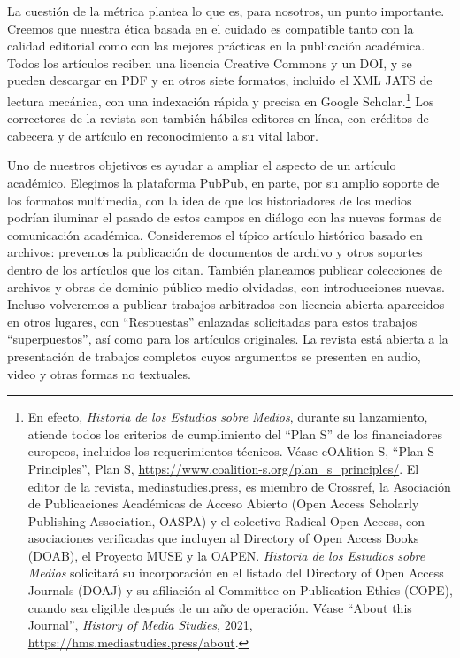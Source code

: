 \documentclass{tufte-handout}
\begin{document}
La cuestión de la métrica plantea lo que es, para nosotros, un punto
importante. Creemos que nuestra ética basada en el cuidado es compatible
tanto con la calidad editorial como con las mejores prácticas en la
publicación académica. Todos los artículos reciben una licencia Creative
Commons y un DOI, y se pueden descargar en PDF y en otros siete
formatos, incluido el XML JATS de lectura mecánica, con una indexación
rápida y precisa en Google Scholar.\footnote{En efecto, \emph{Historia
  de los Estudios sobre Medios}, durante su lanzamiento, atiende todos
  los criterios de cumplimiento del ``Plan S'' de los financiadores
  europeos, incluidos los requerimientos técnicos. Véase cOAlition S,
  ``Plan S Principles'', Plan S,
  \url{https://www.coalition-s.org/plan_s_principles/}. El editor de la
  revista, mediastudies.press, es miembro de Crossref, la Asociación de
  Publicaciones Académicas de Acceso Abierto (Open Access Scholarly
  Publishing Association, OASPA) y el colectivo Radical Open Access, con
  asociaciones verificadas que incluyen al Directory of Open Access
  Books (DOAB), el Proyecto MUSE y la OAPEN. \emph{Historia de los
  Estudios sobre Medios} solicitará su incorporación en el listado del
  Directory of Open Access Journals (DOAJ) y su afiliación al Committee
  on Publication Ethics (COPE), cuando sea eligible después de un año de
  operación. Véase ``About this Journal'', \emph{History of Media
  Studies}, 2021, \url{https://hms.mediastudies.press/about}.} Los
correctores de la revista son también hábiles editores en línea, con
créditos de cabecera y de artículo en reconocimiento a su vital labor.

Uno de nuestros objetivos es ayudar a ampliar el aspecto de un artículo
académico. Elegimos la plataforma PubPub, en parte, por su amplio
soporte de los formatos multimedia, con la idea de que los historiadores
de los medios podrían iluminar el pasado de estos campos en diálogo con
las nuevas formas de comunicación académica. Consideremos el típico
artículo histórico basado en archivos: prevemos la publicación de
documentos de archivo y otros soportes dentro de los artículos que los
citan. También planeamos publicar colecciones de archivos y obras de
dominio público medio olvidadas, con introducciones nuevas. Incluso
volveremos a publicar trabajos arbitrados con licencia abierta
aparecidos en otros lugares, con ``Respuestas'' enlazadas solicitadas
para estos trabajos ``superpuestos'', así como para los artículos
originales. La revista está abierta a la presentación de trabajos
completos cuyos argumentos se presenten en audio, video y otras formas
no textuales.
\end{document}
